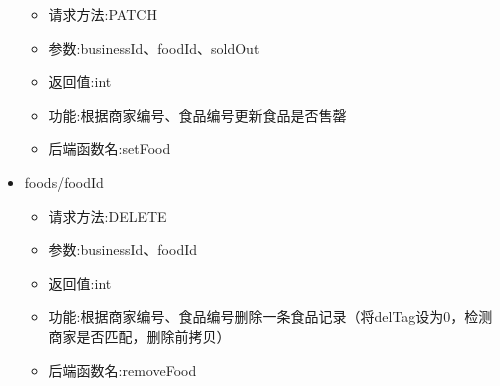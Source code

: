 \begin{itemize}
    \begin{itemize}
    \item 请求方法:PATCH
    \item 参数:businessId、foodId、soldOut
    \item 返回值:int
    \item 功能:根据商家编号、食品编号更新食品是否售罄
    \item 后端函数名:setFood
   \end{itemize}
    \item foods/{foodId}
    \begin{itemize}
    \item 请求方法:DELETE
    \item 参数:businessId、foodId
    \item 返回值:int
    \item 功能:根据商家编号、食品编号删除一条食品记录（将delTag设为0，检测商家是否匹配，删除前拷贝）
    \item 后端函数名:removeFood
    \end{itemize}
\end{itemize}


